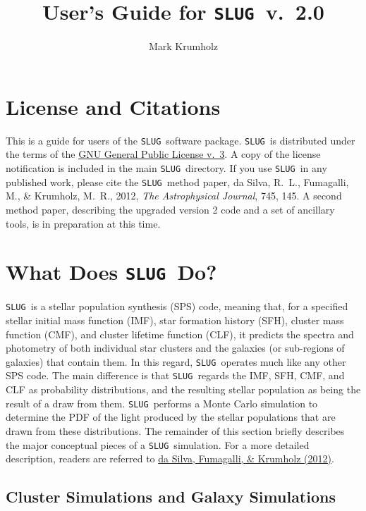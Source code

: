 \documentclass[12pt]{article}
\newcommand{\slug}{\texttt{SLUG}}
\begin{document}
\title{User's Guide for \slug\ v.~2.0}
\author{Mark Krumholz}

\maketitle

\tableofcontents

\clearpage

\section{License and Citations}

This is a guide for users of the \slug\ software package. \slug\ is distributed under the terms of the \href{http://www.gnu.org/licenses/gpl.html}{GNU General Public License v.~3}. A copy of the license notification is included in the main \slug\ directory. If you use \slug\ in any published work, please cite the \slug\ method paper, da Silva, R.~L., Fumagalli, M., \& Krumholz, M.~R., 2012, \textit{The Astrophysical Journal}, 745, 145. A second method paper, describing the upgraded version 2 code and a set of ancillary tools, is in preparation at this time.

\section{What Does \slug\ Do?}

\slug\ is a stellar population synthesis (SPS) code, meaning that, for a specified stellar initial mass function (IMF), star formation history (SFH), cluster mass function (CMF), and cluster lifetime function (CLF), it predicts the spectra and photometry of both individual star clusters and the galaxies (or sub-regions of galaxies) that contain them. In this regard, \slug\ operates much like any other SPS code. The main difference is that \slug\ regards the IMF, SFH, CMF, and CLF as probability distributions, and the resulting stellar population as being the result of a draw from them. \slug\ performs a Monte Carlo simulation to determine the PDF of the light produced by the stellar populations that are drawn from these distributions. The remainder of this section briefly describes the major conceptual pieces of a \slug\ simulation. For a more detailed description, readers are referred to \href{http://adsabs.harvard.edu/abs/2012ApJ...745..145D}{da Silva, Fumagalli, \& Krumholz (2012)}.

\subsection{Cluster Simulations and Galaxy Simulations}
\end{document}
